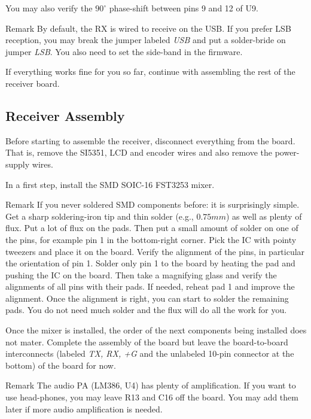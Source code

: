 \documentclass[10pt, a4paper]{scrartcl}
\newenvironment{remark}{\begin{bclogo}[couleur=blue!30,arrondi=.1,logo=\bcinfo,ombre=true]{Remark}}{\end{bclogo}}
\begin{document}
You may also verify the $90^\circ$ phase-shift between pins 9 and 12 of U9.

\begin{remark}
By default, the RX is wired to receive on the USB. If you prefer LSB reception, you may break the jumper labeled \emph{USB} and put a solder-bride on jumper \emph{LSB}. You also need to set the side-band in the firmware.
\end{remark} 

If everything works fine for you so far, continue with assembling the rest of the receiver board.


\subsection{Receiver Assembly}
Before starting to assemble the receiver, disconnect everything from the board. That is, remove the SI5351, LCD and encoder wires and also remove the power-supply wires.

In a first step, install the SMD SOIC-16 FST3253 mixer. 

\begin{remark}
If you never soldered SMD components before: it is surprisingly simple. Get a sharp soldering-iron tip and thin solder (e.g., $0.75mm$) as well as plenty of flux. Put a lot of flux on the pads. Then put a small amount of solder on one of the pins, for example pin 1 in the bottom-right corner. Pick the IC with pointy tweezers and place it on the board. Verify the alignment of the pins, in particular the orientation of pin 1. Solder only pin 1 to the board by heating the pad and pushing the IC on the board. Then take a magnifying glass and verify the alignments of all pins with their pads. If needed, reheat pad 1 and improve the alignment. Once the alignment is right, you can start to solder the remaining pads. You do not need much solder and the flux will do all the work for you.
\end{remark}

Once the mixer is installed, the order of the next components being installed does not mater. Complete the assembly of the board but leave the board-to-board interconnects (labeled \emph{TX, RX, +G} and the unlabeled 10-pin connector at the bottom) of the board for now. 

\begin{remark}
The audio PA (LM386, U4) has plenty of amplification. If you want to use head-phones, you may leave R13 and C16 off the board. You may add them later if more audio amplification is needed.
\end{remark}
\end{document}
